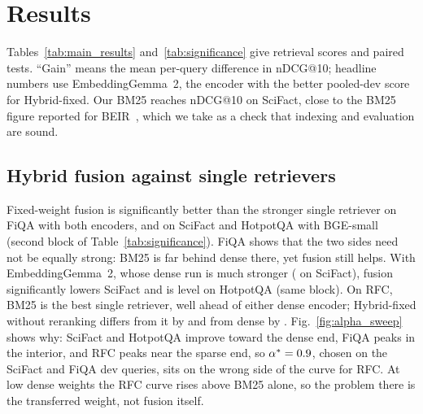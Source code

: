 \section{Results}
\label{sec:results}

Tables~\ref{tab:main_results} and~\ref{tab:significance} give retrieval
scores and paired tests. ``Gain'' means the mean per-query difference in
nDCG@10; headline numbers use EmbeddingGemma~2, the encoder with the better
pooled-dev score for Hybrid-fixed. Our BM25 reaches
\BMndcgSciFact{} nDCG@10 on SciFact, close to the BM25 figure reported for
BEIR~\cite{thakur2021beir}, which we take as a check that indexing and
evaluation are sound.


\subsection{Hybrid fusion against single retrievers}
Fixed-weight fusion is significantly better than the stronger single
retriever on FiQA with both encoders, and on SciFact and HotpotQA with
BGE-small (second block of Table~\ref{tab:significance}). FiQA shows that the
two sides need not be equally strong: BM25 is far behind dense there, yet
fusion still helps. With EmbeddingGemma~2, whose dense run is much stronger
(\BestNDCGSciFact{} on SciFact), fusion significantly lowers SciFact and is
level on HotpotQA (same block). On RFC, BM25 is the best single retriever,
well ahead of either dense encoder; Hybrid-fixed without reranking differs
from it by \HybridGainOverBMRFC{} and from dense by \HybridGainOverDenseRFC. Fig.~\ref{fig:alpha_sweep} shows why: SciFact and
HotpotQA improve toward the dense end, FiQA peaks in the interior, and RFC
peaks near the sparse end, so $\alpha^{*}=0.9$, chosen on the SciFact
and FiQA dev queries, sits on the wrong side of the curve for RFC. At low
dense weights the RFC curve rises above BM25 alone, so the problem there is
the transferred weight, not fusion itself.


